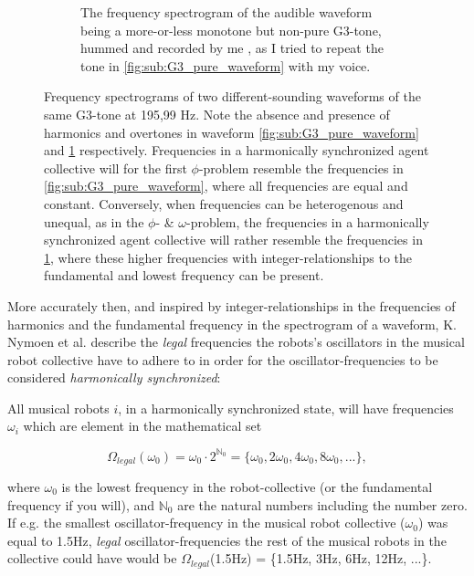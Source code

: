 \begin{figure}[ht!]
\begin{subfigure}[t]{.5\textwidth}
			\caption{The frequency spectrogram of the audible waveform being a more-or-less monotone but non-pure G3-tone, hummed and recorded by me \cite{}, as I tried to repeat the tone in \ref{fig:sub:G3_pure_waveform} with my voice.}
			\label{fig:sub:G3_hummed_waveform}
		\end{subfigure}
	\caption[Frequency spectrograms illustrating the absence and presence of harmonics and overtones in audible waveforms]{Frequency spectrograms of two different-sounding waveforms of the same G3-tone at 195,99 Hz. Note the absence and presence of harmonics and overtones in waveform \ref{fig:sub:G3_pure_waveform} and \ref{fig:sub:G3_hummed_waveform} respectively. Frequencies in a harmonically synchronized agent collective will for the first $\phi$-problem resemble the frequencies in \ref{fig:sub:G3_pure_waveform}, where all frequencies are equal and constant. Conversely, when frequencies can be heterogenous and unequal, as in the $\phi$- \& $\omega$-problem, the frequencies in a harmonically synchronized agent collective will rather resemble the frequencies in \ref{fig:sub:G3_hummed_waveform}, where these higher frequencies with integer-relationships to the fundamental and lowest frequency can be present.}
	\label{fig:frequency_spectrograms}
\end{figure}

More accurately then, and inspired by integer-relationships in the frequencies of harmonics and the fundamental frequency in the spectrogram of a waveform, K. Nymoen et al. \cite{nymoen_synch} describe the \textit{legal} frequencies the robots's oscillators in the musical robot collective have to adhere to in order for the oscillator-frequencies to be considered \textit{harmonically synchronized}:

All musical robots $i$, in a harmonically synchronized state, will have frequencies $\omega_i$ which are element in the mathematical set

\begin{equation}\label{legal_freqs}
\Omega_{legal}(\omega_0) = \omega_{0} \cdot 2^{\mathbb{N}_0} = \{\omega_{0}, 2\omega_{0}, 4\omega_{0}, 8\omega_{0}, ...\} ,
\end{equation}

where $\omega_{0}$ is the lowest frequency in the robot-collective (or the fundamental frequency if you will), and $\mathbb{N}_0$ are the natural numbers including the number zero. If e.g. the smallest oscillator-frequency in the musical robot collective ($\omega_0$) was equal to 1.5Hz, \textit{legal} oscillator-frequencies the rest of the musical robots in the collective could have would be $\Omega_{legal}$(1.5Hz) = \{1.5Hz, 3Hz, 6Hz, 12Hz, ...\}.

